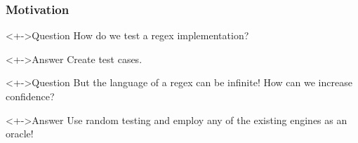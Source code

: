 \documentclass[pdftex]{beamer}
\begin{document}
\begin{frame}
  \frametitle{Motivation}
  \begin{block}<+->{Question}
    How do we test a regex implementation?
  \end{block}
  \begin{exampleblock}<+->{Answer}
    Create test cases.
  \end{exampleblock}
  \begin{block}<+->{Question}
    But the language of a regex can be infinite! How can we increase confidence?
  \end{block}
  \begin{exampleblock}<+->{Answer}
    Use random testing and employ any of the existing engines as an oracle!
  \end{exampleblock}
\end{frame}
\end{document}
